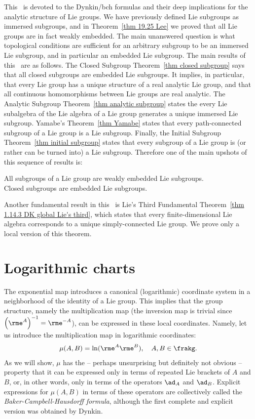 This \chap\ is devoted to the Dynkin/\gls{bch} formulas and their deep implications for the analytic structure of Lie groups. We have previously defined Lie subgroups as immersed subgroups, and in Theorem~\ref{thm 19.25 Lee} we proved that all Lie groups are in fact weakly embedded. The main unanswered question is what topological conditions are sufficient for an arbitrary subgroup to be an immersed Lie subgroup, and in particular an embedded Lie subgroup. The main results of this \chap\ are as follows. The Closed Subgroup Theorem~\ref{thm closed subgroup} says that all closed subgroups are embedded Lie subgroups. It implies, in particular, that every Lie group has a unique structure of a real analytic Lie group, and that all continuous homomorphisms between Lie groups are real analytic. The Analytic Subgroup Theorem~\ref{thm analytic subgroup} states the every Lie subalgebra of the Lie algebra of a Lie group generates a unique immersed Lie subgroup. Yamabe's Theorem~\ref{thm Yamabe} states that every path-connected subgroup of a Lie group is a Lie subgroup.  Finally, the Initial Subgroup Theorem~\ref{thm initial subgroup} states that every subgroup of a Lie group is (or rather can be turned into) a Lie subgroup. Therefore one of the main upshots of this sequence of results is:
\begin{center}
    All subgroups of a Lie group are weakly embedded Lie subgroups.\\
    Closed subgroups are embedded Lie subgroups.
\end{center}
Another fundamental result in this \chap\ is Lie's Third Fundamental Theorem~\ref{thm 1.14.3 DK global Lie's third}, which states that every finite-dimensional Lie algebra corresponds to a unique simply-connected Lie group. We prove only a local version of this theorem.





\section{Logarithmic charts}\label{sec: product in log coordinates}

The exponential map introduces a canonical (logarithmic) coordinate system in a neighborhood of the identity of a Lie group. This implies that the group structure, namely the multiplication map (the inversion map is trivial since $\left(\rme^A\right)^{-1}=\rme^{-A}$), can be expressed in these local coordinates. Namely, let us introduce the multiplication map in logarithmic coordinates:
\[\mu(A,B)=\ln(\rme^A\rme^B),\quad A,B\in\frakg.\]
As we will show, $\mu$ has the -- perhaps unsurprising but definitely not obvious -- property that it can be expressed only in terms of repeated Lie brackets of $A$ and $B$, or, in other words, only in terms of the operators $\ad_A$ and $\ad_B$. Explicit expressions for $\mu(A,B)$ in terms of these operators are collectively called the \emph{Baker-Campbell-Hausdorff formula}, although the first complete and explicit version was obtained by Dynkin.

